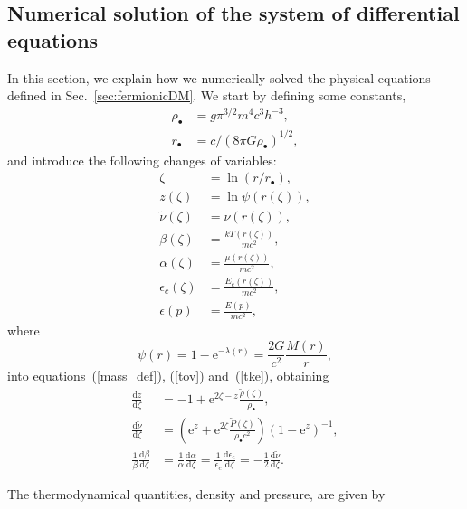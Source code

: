 \documentclass[twocolumn]{aa}
\begin{document}
\begin{appendix}
\section{Numerical solution of the system of differential equations}
\label{app:numerical}
In this section, we explain how we numerically solved the physical equations defined in Sec.~\ref{sec:fermionicDM}.
We start by defining some constants,
\begin{align}
    \rho_{\bullet}&= g\pi^{3/2} m^4 c^3 h^{-3},\\
    r_\bullet &= c/(8\pi G \rho_\bullet)^{1/2},
\end{align}
and introduce the following changes of variables:
\begin{align}
   \zeta &= \ln(r/r_\bullet),\\
   z(\zeta) &=\ln\psi(r(\zeta)),\\
   \tilde{\nu}(\zeta) &=\nu(r(\zeta)),\\
   \beta(\zeta)&=\frac{kT(r(\zeta))}{mc^2},\\
   \alpha(\zeta)&=\frac{\mu(r(\zeta))}{mc^2},\\
   \epsilon_c(\zeta)&=\frac{E_c(r(\zeta))}{mc^2},\\
   \epsilon(p)&=\frac{E(p)}{mc^2},
\end{align}
where
\begin{equation}
    \psi(r) = 1-\textrm{e}^{-\lambda(r)} = \frac{2G}{c^2}\frac{M(r)}{r},
    \label{mass_dm}
\end{equation}
into equations~(\ref{mass_def}), (\ref{tov}) and~(\ref{tke}), obtaining
\begin{align}
   \label{sode}
   \frac{\mathrm{d}z}{\mathrm{d}\zeta} & = -1+\mathrm{e}^{2\zeta-z}\frac{\tilde{\rho}(\zeta)}{\rho_{\bullet}},\\
   \label{sode2}
   \frac{\mathrm{d}\tilde{\nu}}{\mathrm{d}\zeta} & = \left(\mathrm{e}^{z}+\mathrm{e}^{2\zeta}\frac{\tilde{P}(\zeta)}{\rho_{\bullet}c^2}\right)(1-\mathrm{e}^{z})^{-1},\\
   \frac{1}{\beta}\frac{\mathrm{d}\beta}{\mathrm{d}\zeta}&=\frac{1}{\alpha}\frac{\mathrm{d}\alpha}{\mathrm{d}\zeta}=
   \frac{1}{\epsilon_\mathrm{c}}\frac{\mathrm{d} \epsilon_\mathrm{c}}{\mathrm{d}\zeta}=-\frac{1}{2}\frac{\mathrm{d}\tilde{\nu}}{\mathrm{d}\zeta}.\label{tke2}
\end{align}


The thermodynamical quantities, density and pressure, are given by


\end{appendix}
\end{document}

